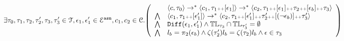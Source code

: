 \begin{defn}
 \[
\exists \vtrace_0, \vtrace_1, \vtrace_2, \trace_2', \vtrace_3, \vtrace_3'  \in \mathcal{T}, 
\event_1, \event_1' \in \eventset^{\asn},  {c}_1, c_2 \in \cdom.
\left(
\begin{array}{ll}   
  & \config{{c}, \vtrace_0} \rightarrow^{*} 
    \config{{c}_1, \vtrace_1 \tracecat [\event_1]}  \rightarrow^{*} 
    \config{c_2,  \vtrace_1 \tracecat [\event_1] \tracecat \trace_2 \tracecat [\event_b] \tracecat  \trace_3} 
  \\ 
  \bigwedge &
  \config{{c}_1, \vtrace_1 \tracecat [\event_1']}  \rightarrow^{*} 
  \config{c_2,  \vtrace_1 \tracecat [\event_1'] \tracecat \trace_2' \tracecat [(\neg \event_b)] \tracecat \trace_3'} 
  \\
  \bigwedge &  \diff(\event_1, \event_1') \land \tlabel_{\trace_3} \cap \tlabel_{\trace_3'} = \emptyset\\ 
  \bigwedge & l_b = \pi_2(\event_b) \land \vcounter(\vtrace_2') l_b = \vcounter(\trace_2) l_b
    \land \event \in \trace_3
\end{array}
\right)
 \]
\end{defn}
%

